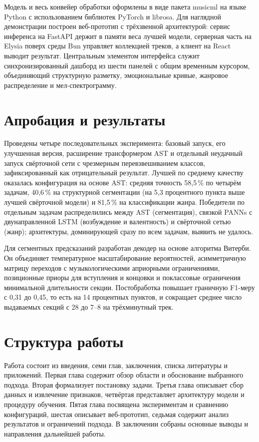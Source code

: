 \documentclass[master,summary]{pmk-graduate}
\begin{document}
Модель и весь конвейер обработки оформлены в виде пакета musicml на языке Python
с использованием библиотек PyTorch и librosa. Для наглядной демонстрации построен
веб-прототип с трёхзвенной архитектурой: сервис инференса на FastAPI держит в
памяти веса лучшей модели, серверная часть на Elysia поверх среды Bun управляет
коллекцией треков, а клиент на React выводит результат. Центральным элементом
интерфейса служит синхронизированный дашборд из шести панелей с общим временным
курсором, объединяющий структурную разметку, эмоциональные кривые, жанровое
распределение и мел-спектрограмму.

\section{Апробация и результаты}

Проведены четыре последовательных эксперимента: базовый запуск, его улучшенная
версия, расширение трансформером AST и отдельный неудачный запуск свёрточной сети
с чрезмерным перевзвешиванием классов, зафиксированный как отрицательный результат.
Лучшей по среднему качеству оказалась конфигурация на основе AST: средняя точность
58,5\,\% по четырём задачам, 40,6\,\% на структурной сегментации (на 5,3 процентного
пункта выше лучшей свёрточной модели) и 81,5\,\% на классификации жанра. Победители
по отдельным задачам распределились между AST (сегментация), связкой PANNs с
двунаправленной LSTM (возбуждение и валентность) и свёрточной сетью (жанр);
архитектуры, доминирующей сразу по всем задачам, выявить не удалось.

Для сегментных предсказаний разработан декодер на основе алгоритма Витерби. Он
объединяет температурное масштабирование вероятностей, асимметричную матрицу
переходов с музыкологическими априорными ограничениями, позиционные приоры для
вступления и концовки и поклассовые ограничения минимальной длительности секции.
Постобработка повышает граничную F1-меру с 0,31 до 0,45, то есть на 14 процентных
пунктов, и сокращает среднее число выдаваемых секций с 28 до 7--8 на трёхминутный
трек.

\section{Структура работы}

Работа состоит из введения, семи глав, заключения, списка литературы и приложений.
Первая глава содержит обзор области и обоснование выбранного подхода. Вторая
формализует постановку задачи. Третья глава описывает сбор данных и извлечение
признаков, четвёртая представляет архитектуру модели и процедуру обучения. Пятая
глава посвящена экспериментам и сравнению конфигураций, шестая описывает
веб-прототип, седьмая содержит анализ результатов и ограничений подхода. В
заключении собраны основные выводы и направления дальнейшей работы.
\end{document}
